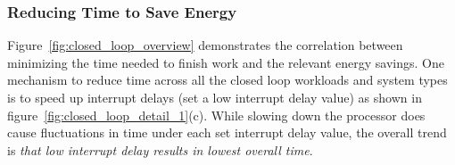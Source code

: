 
















\subsubsection{Reducing Time to Save Energy}
\label{sec:closed_loop:speedup}
Figure~\ref{fig:closed_loop_overview} demonstrates the correlation between minimizing the time needed to finish work and the relevant energy savings.
One mechanism to reduce time across all the closed loop workloads and system types is to speed up interrupt delays (set a low interrupt delay value) as shown in figure~\ref{fig:closed_loop_detail_1}(c).
While slowing down the processor does cause fluctuations in time under each set interrupt delay value, the overall trend is \textit{that low interrupt delay results in lowest overall time}.

